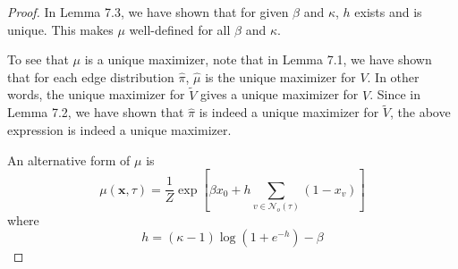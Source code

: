 \documentclass[12pt]{article}
\numberwithin{equation}{section}
\begin{document}
\begin{proof}
    In Lemma 7.3, we have shown that for given $\beta$ and $\kappa$, $h$ exists and is unique.
    This makes $\mu$ well-defined for all $\beta$ and $\kappa$.

    To see that $\mu$ is a unique maximizer, note that in Lemma 7.1, we have shown that for each edge distribution $\widehat{\pi}$, $\widehat{\mu}$ is the unique maximizer for $V$.
    In other words, the unique maximizer for $\widetilde{V}$ gives a unique maximizer for $V$. Since in Lemma 7.2, we have shown that $\widehat{\pi}$ is
    indeed a unique maximizer for $\widetilde{V}$, the above expression is indeed a unique maximizer.

    An alternative form of $\mu$ is
    \begin{equation}
        \mu(\mathbf{x}, \tau) = \frac1Z \exp\left[\beta x_0 + h \sum_{v\in\mathcal{N}_o(\tau)}(1-x_v)\right]
    \end{equation}
    where
    \begin{equation*}
        h = (\kappa - 1)\log (1+e^{-h}) - \beta
    \end{equation*}


\end{proof}
\end{document}
